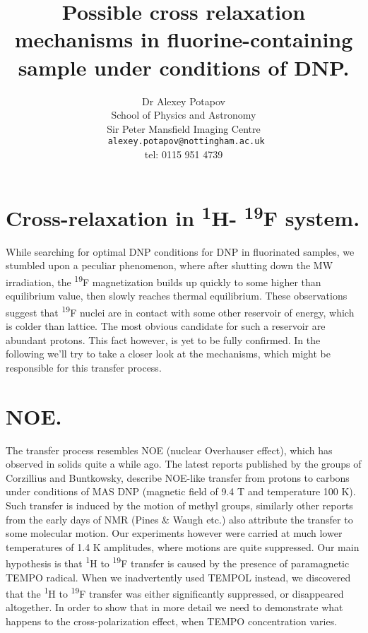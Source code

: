 \documentclass[a4paper, 12pt]{article}
\begin{document}
\title{Possible cross relaxation mechanisms in fluorine-containing sample under conditions of DNP.}
\author{Dr Alexey Potapov\\
School of Physics and Astronomy\\
Sir Peter Mansfield Imaging Centre \\
\texttt{ alexey.potapov@nottingham.ac.uk}\\
tel: 0115 951 4739 }
\maketitle
 
 
\section{Cross-relaxation in \textsuperscript{1}H- \textsuperscript{19}F system.}
While searching for optimal DNP conditions for DNP in fluorinated samples, we stumbled upon a peculiar phenomenon, where after shutting down the MW irradiation, the \textsuperscript{19}F magnetization builds up quickly to some higher than equilibrium value, then slowly reaches thermal equilibrium. These observations suggest that \textsuperscript{19}F nuclei are in contact with some other reservoir of energy, which is colder than lattice. The most obvious candidate for such a reservoir are abundant protons. This fact however, is yet to be fully confirmed.  
In the following we'll try to take a closer look at the mechanisms, which might be responsible for this transfer process.
\section{NOE.}
The transfer process resembles NOE (nuclear Overhauser effect), which has observed in solids quite a while ago. The latest reports published by the groups of Corzillius and Buntkowsky, describe NOE-like transfer from protons to carbons under conditions of MAS DNP (magnetic field of 9.4 T and temperature 100 K). Such transfer is induced by the motion of methyl groups, similarly other reports from the early days of NMR (Pines \& Waugh etc.) also attribute the transfer to some molecular motion. Our experiments however were carried at much lower temperatures of 1.4 K amplitudes, where motions are quite suppressed. 
Our main hypothesis is that \textsuperscript{1}H to \textsuperscript{19}F transfer is caused by the presence of paramagnetic TEMPO radical. When we inadvertently used  TEMPOL instead, we discovered that the \textsuperscript{1}H to \textsuperscript{19}F transfer was either significantly suppressed, or disappeared altogether. In order to show that in more detail we need to demonstrate what happens to the cross-polarization effect, when TEMPO concentration varies.
\end{document}
